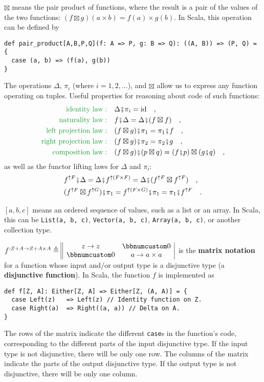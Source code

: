 $\boxtimes$ means the pair product
of functions, where the result is a pair of the values of the two
functions: $(f\boxtimes g)(a\times b)=f(a)\times g(b)$. In Scala,
this operation can be defined by
\begin{lstlisting}
def pair_product[A,B,P,Q](f: A => P, g: B => Q): ((A, B)) => (P, Q) = {
  case (a, b) => (f(a), g(b))
}
\end{lstlisting}
The operations $\Delta$, $\pi_{i}$ (where $i=1,2,...$), and $\boxtimes$
allow us to express any function operating on tuples. Useful properties
for reasoning about code of such functions: 
\begin{align*}
{\color{greenunder}\text{identity law}:}\quad & \Delta\bef\pi_{i}=\text{id}\quad,\\
{\color{greenunder}\text{naturality law}:}\quad & f\bef\Delta=\Delta\bef(f\boxtimes f)\quad,\\
{\color{greenunder}\text{left projection law}:}\quad & (f\boxtimes g)\bef\pi_{1}=\pi_{1}\bef f\quad,\\
{\color{greenunder}\text{right projection law}:}\quad & (f\boxtimes g)\bef\pi_{2}=\pi_{2}\bef g\quad,\\
{\color{greenunder}\text{composition law}:}\quad & (f\boxtimes g)\bef(p\boxtimes q)=(f\bef p)\boxtimes(g\bef q)\quad,
\end{align*}
as well as the functor lifting laws for $\Delta$ and $\pi_{i}$:
\begin{align*}
 & f^{\uparrow F}\bef\Delta=\Delta\bef f^{\uparrow(F\times F)}=\Delta\bef(f^{\uparrow F}\boxtimes f^{\uparrow F})\quad,\\
 & (f^{\uparrow F}\boxtimes f^{\uparrow G})\bef\pi_{1}=f^{\uparrow(F\times G)}\bef\pi_{1}=\pi_{1}\bef f^{\uparrow F}\quad.
\end{align*}

$\left[a,b,c\right]$ means an ordered sequence of values, such as
a list or an array. In Scala, this can be \lstinline!List(a, b, c)!,
\lstinline!Vector(a, b, c)!, \lstinline!Array(a, b, c)!, or another
collection type.

$f^{:Z+A\rightarrow Z+A\times A}\triangleq\begin{array}{||cc|}
z\rightarrow z & \bbnum 0\\
\bbnum 0 & a\rightarrow a\times a
\end{array}\,$ is the \textbf{matrix notation} for a function
whose input and/or output type is a disjunctive type (a
\textbf{disjunctive function}). In Scala, the function $f$ is implemented
as
\begin{lstlisting}
def f[Z, A]: Either[Z, A] => Either[Z, (A, A)] = {
  case Left(z)   => Left(z) // Identity function on Z.
  case Right(a)  => Right((a, a)) // Delta on A.
}
\end{lstlisting}
The rows of the matrix indicate the different \lstinline!case!s in
the function\textsf{'}s code, corresponding to the different parts of the input
disjunctive type. If the input type is not disjunctive, there will
be only one row. The columns of the matrix indicate the parts of the
output disjunctive type. If the output type is not disjunctive, there
will be only one column.

